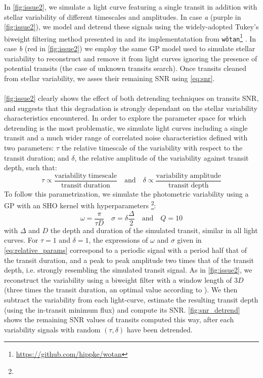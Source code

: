 \documentclass{aastex631}
\begin{document}
In \autoref{fig:issue2}, we simulate a light curve featuring a single transit in addition with stellar variability of different timescales and amplitudes. In case \textit{a} (purple in \autoref{fig:issue2}), we model and detrend these signals using the widely-adopted Tukey's biweight filtering method presented in \citealt{tukey} and its implementatation from \texttt{wõtan}\footnote{\href{https://github.com/hippke/wotan}{https://github.com/hippke/wotan}} \citep{wotan}. In case \textit{b} (red in \autoref{fig:issue2}) we employ the same GP model used to simulate stellar variability to reconstruct and remove it from light curves ignoring the presence of potential transits (the case of unknown transits search). Once transits cleaned from stellar variability, we asses their remaining SNR using \autoref{eq:snr}.
\\\\
\autoref{fig:issue2} clearly shows the effect of both detrending techniques on transits SNR, and suggests that this degradation is strongly dependant on the stellar variability characteristics encountered. In order to explore the parameter space for which detrending is the most problematic, we simulate light curves including a single transit and a much wider range of correlated noise characteristics defined with two parameters: $\tau$ the relative timescale of the variability with respect to the transit duration; and $\delta$, the relative amplitude of the variability against transit depth, such that:
\begin{equation}\label{eq:relative_param_space}
    \tau \propto \frac{\mathrm{variability\; timescale}}{\mathrm{transit\;duration}} \quad \text{and} \quad 
    \delta \propto \frac{\mathrm{variability\; amplitude}}{\mathrm{transit\;depth}} 
\end{equation}
To follow this parametrization, we simulate the photometric variability using a GP with an SHO kernel with hyperparameters \footnote{}:
\begin{equation}\label{eq:relative_params}
    \omega = \frac{\pi}{\tau D} \quad 
    \sigma = \delta \frac{\Delta}{2} \quad  \text{and}  \quad  
    Q = 10
\end{equation}
with $\Delta$ and $D$ the depth and duration of the simulated transit, similar in all light curves. 
For $\tau=1$ and $\delta=1$, the expressions of $\omega$ and $\sigma$ given in \autoref{eq:relative_params} correspond to a periodic signal with a period half that of the transit duration, and a peak to peak amplitude two times that of the transit depth, i.e. strongly resembling the simulated transit signal. As in \autoref{fig:issue2}, we reconstruct the variability using a biweight filter with a window length of $3D$ (three times the transit duration, an optimal value according to \citealt{wotan}). We then subtract the variability from each light-curve, estimate the resulting transit depth (using the in-transit minimum flux) and compute its SNR. \autoref{fig:snr_detrend} shows the remaining SNR values of transits computed this way, after each variability signals with random $(\tau, \delta)$ have been detrended.
\end{document}
